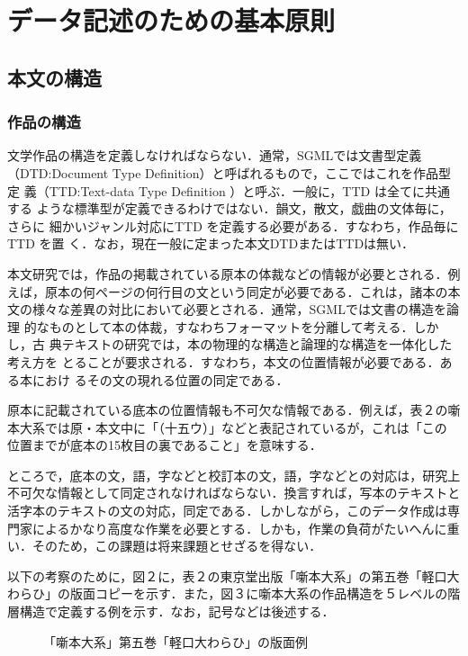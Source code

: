 \section{データ記述のための基本原則}
\label{sec:3shou}


\subsection{本文の構造}
\label{sec:3.1setu}

\subsubsection{作品の構造}
\label{sec:3.1.1setu}

文学作品の構造を定義しなければならない．通常，SGMLでは文書型定義
（DTD:Document Type Definition）と呼ばれるもので，ここではこれを作品型定
義（TTD:Text-data Type Definition ）と呼ぶ．一般に，TTD は全てに共通する
ような標準型が定義できるわけではない．韻文，散文，戯曲の文体毎に，さらに
細かいジャンル対応にTTD を定義する必要がある．すなわち，作品毎にTTD を置
く．なお，現在一般に定まった本文DTDまたはTTDは無い．

本文研究では，作品の掲載されている原本の体裁などの情報が必要とされる．例
えば，原本の何ページの何行目の文という同定が必要である．これは，諸本の本
文の様々な差異の対比において必要とされる．通常，SGMLでは文書の構造を論理
的なものとして本の体裁，すなわちフォーマットを分離して考える．しかし，古
典テキストの研究では，本の物理的な構造と論理的な構造を一体化した考え方を
とることが要求される．すなわち，本文の位置情報が必要である．ある本におけ
るその文の現れる位置の同定である．

原本に記載されている底本の位置情報も不可欠な情報である．例えば，表２の噺
本大系では原・本文中に「（十五ウ）」などと表記されているが，これは「この
位置までが底本の15枚目の裏であること」を意味する．

ところで，底本の文，語，字などと校訂本の文，語，字などとの対応は，研究上
不可欠な情報として同定されなければならない．換言すれば，写本のテキストと
活字本のテキストの文の対応，同定である．しかしながら，このデータ作成は専
門家によるかなり高度な作業を必要とする．しかも，作業の負荷がたいへんに重
い．そのため，この課題は将来課題とせざるを得ない．

以下の考察のために，図２に，表２の東京堂出版「噺本大系」の第五巻「軽口大
わらひ」の版面コピーを示す．また，図３に噺本大系の作品構造を５レベルの階
層構造で定義する例を示す．なお，記号などは後述する．


\begin{figure}[htbp]
  \begin{center}
    \leavevmode
{}

    \caption{「噺本大系」第五巻「軽口大わらひ」の版面例}
    \label{fig:2}
  \end{center}
\end{figure}



